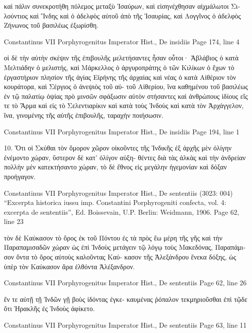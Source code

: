 \documentclass[12pt,letterpaper,twoside,final]{memoir}
\begin{document}
\begin{greek}
                    καὶ πάλιν συνεκροτήθη πόλεμος μεταξὺ Ἰσαύρων, 
καὶ εἰσηνέχθησαν αἰχμάλωτοι Σιλούντιος καὶ Ἴνδης καὶ ὁ ἀδελφὸς 
αὐτοῦ ἀπὸ τῆς Ἰσαυρίας, καὶ Λογγῖνος ὁ ἀδελφὸς Ζήνωνος τοῦ 
βασιλέως ἐξωρίσθη. 



Constantinus VII Porphyrogenitus Imperator Hist., De insidiis 
Page 174, line 4

                                               οἱ δὲ τὴν αὐτὴν σκέψιν τῆς 
ἐπιβουλῆς μελετήσαντες ἦσαν οὗτοι· Ἀβλάβιος ὁ κατὰ Μελτιάδην 
ὁ μελιστής, καὶ Μάρκελλος ὁ ἀργυροπράτης ὁ τῶν Κιλίκων ὁ ἔχων 
τὸ ἐργαστήριον πλησίον τῆς ἁγίας Εἰρήνης τῆς ἀρχαίας καὶ νέας   
ὁ κατὰ Αἰθέριον τὸν κουράτορα, καὶ Σέργιος ὁ ἀνεψιὸς τοῦ αὐ-
τοῦ Αἰθερίου, ἵνα καθημένου τοῦ βασιλέως ἐν τῷ παλατίῳ ὀψίας 
πρὸ μινσῶν σφάξωσιν αὐτὸν στήσαντες καὶ ἀνθρώπους ἰδίους εἴς 
τε τὸ Ἅρμα καὶ εἰς τὸ Σελεντιαρίκιν καὶ κατὰ τοὺς Ἰνδοὺς καὶ κατὰ 
τὸν Ἀρχάγγελον, ἵνα, γινομένης τῆς αὐτῆς ἐπιβουλῆς, ταραχὴν 
ποιήσωσιν. 



Constantinus VII Porphyrogenitus Imperator Hist., De insidiis 
Page 194, line 1

10. Ὅτι οἱ Σκύθαι τὸν ὅμορον χῶρον οἰκοῦντες τῆς Ἰνδικῆς ἐξ 
ἀρχῆς μὲν ὀλίγην ἐνέμοντο χώραν, ὕστερον δὲ κατ' ὀλίγον αὐξη-
θέντες διὰ τὰς ἀλκὰς καὶ τὴν ἀνδρείαν πολλὴν μὲν κατεκτήσαντο 
χώραν, τὸ δὲ ἔθνος εἰς μεγάλην ἡγεμονίαν καὶ δόξαν προήγαγον. 



Constantinus VII Porphyrogenitus Imperator Hist., De sententiis (3023: 004)
“Excerpta historica iussu imp. Constantini Porphyrogeniti confecta, vol. 4: excerpta de sententiis”, Ed. Boissevain, U.P.
Berlin: Weidmann, 1906.
Page 62, line 23

                                                    τὸν δὲ Καύκασον 
τὸ ὄρος ἐκ τοῦ Πόντου ἐς τὰ πρὸς ἕω μέρη τῆς γῆς καὶ τὴν 
Παραπαμισαδῶν χώραν ὡς ἐπὶ Ἰνδοὺς μετάγειν τῷ λόγῳ τοὺς 
Μακεδόνας, Παραπάμισον ὄντα τὸ ὄρος αὐτοὺς καλοῦντας Καύ-
κασον τῆς Ἀλεξάνδρου ἕνεκα δόξης, ὡς ὑπὲρ τὸν Καύκασον ἄρα 
ἐλθόντα Ἀλέξανδρον. 



Constantinus VII Porphyrogenitus Imperator Hist., De sententiis 
Page 62, line 26

                         ἔν τε αὐτῇ τῇ Ἰνδῶν γῇ βοὺς ἰδόντας ἐγκε-
καυμένας ῥόπαλον τεκμηριοῦσθαι ἐπὶ τῷδε ὅτι Ἡρακλῆς ἐς Ἰνδοὺς 
ἀφίκετο. 



Constantinus VII Porphyrogenitus Imperator Hist., De sententiis 
Page 63, line 11


\end{greek}
\end{document}
